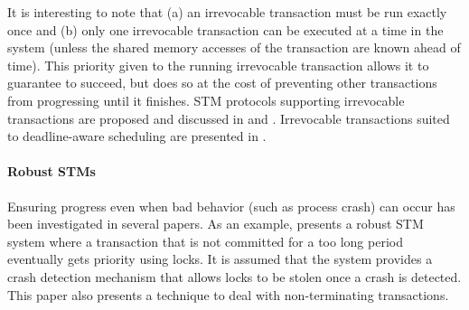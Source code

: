 It is interesting to note that (a) an irrevocable transaction must be run 
exactly  once and (b) only one irrevocable transaction can be executed at 
a time in the system (unless the shared memory accesses of the transaction 
are known ahead of time).
This priority given to the running irrevocable transaction allows it
to guarantee to succeed, but does so at the cost of preventing other
transactions from progressing until it finishes.
STM protocols supporting irrevocable transactions are proposed and discussed  in 
\cite{SSDMS08}  and   \cite{WSA08}.  Irrevocable  transactions   suited  to
deadline-aware scheduling are presented  in \cite{MMFLMR11}. 


%
%




\paragraph{Robust STMs} 
Ensuring progress even when bad behavior (such as process crash) can occur 
has been investigated in several papers. As an example,  \cite{WRFF10} 
presents a robust STM system where a transaction that is not committed 
for a too long period eventually gets  priority using locks. It is assumed 
that  the system   provides a   crash detection  mechanism that  allows 
locks to be stolen once a  crash  is detected. This paper also presents a
technique to deal with  non-terminating transactions. 


